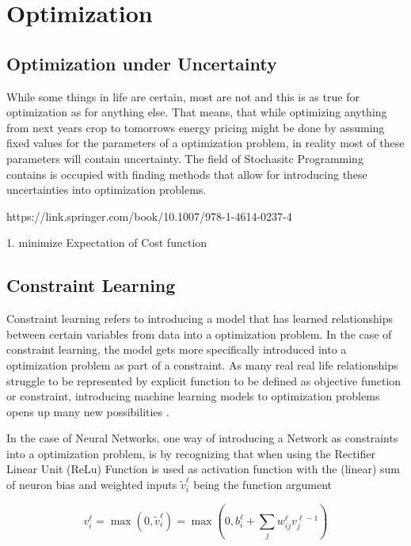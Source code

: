 
\chapter{Optimization}\label{section:optimization}

\section{Optimization under Uncertainty}

While some things in life are certain, most are not and this is as true for optimization as for anything else. That means, that while optimizing anything from next years crop to tomorrows energy pricing might be done by assuming fixed values for the parameters of a optimization problem, in reality most of these parameters will contain uncertainty. The field of Stochasitc Programming contains is occupied with finding methods that allow for introducing these uncertainties into optimization problems.



https://link.springer.com/book/10.1007/978-1-4614-0237-4

1. minimize Expectation of Cost function 


\section{Constraint Learning} \label{sec:constraint_learning}

Constraint learning refers to introducing a model that has learned relationships between certain variables from data into a optimization problem. In the case of constraint learning, the model gets more specifically introduced into a optimization problem as part of a constraint. As many real real life relationships struggle to be represented by explicit function to be defined as objective function or constraint, introducing machine learning models to optimization problems opens up many new possibilities \cite{FAJEMISIN20241}.

In the case of Neural Networks, one way of introducing a Network as constraints into a optimization problem, is by recognizing that when using the Rectifier Linear Unit (ReLu) Function is used as activation function with the (linear) sum of neuron bias and weighted inputs $\tilde{v}_i^\ell$ being the function argument


\begin{equation}
	v_i^\ell = \max(0, \tilde{v}_i^\ell) = \max(0,  b_i^\ell + \sum_j w_{ij}^\ell v_j^{\ell - 1})
\end{equation}


